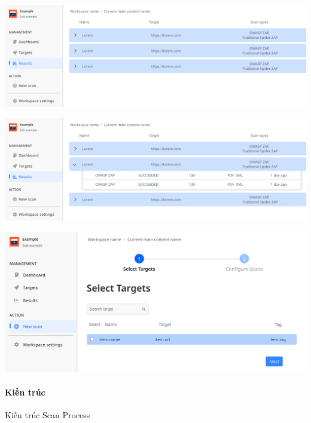\includegraphics[width=\textwidth]{images/prototype/prototype_25102022/dashboard_result.png}

\vspace{1cm}

\includegraphics[width=\textwidth]{images/prototype/prototype_25102022/dashboard_result_opening-sub.png}

\vspace{1cm}

\includegraphics[width=\textwidth]{images/prototype/prototype_22112022/dashboad_new scan_select target.png}

\vspace{1cm}

\paragraph{Kiến trúc}
\tab Kiến trúc Scan Process
\vspace{2cm}


